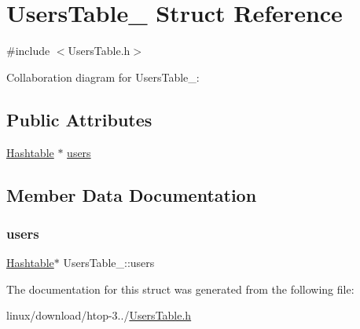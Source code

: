 \hypertarget{structUsersTable__}{}\section{Users\+Table\+\_\+ Struct Reference}
\label{structUsersTable__}


{\ttfamily \#include $<$Users\+Table.\+h$>$}



Collaboration diagram for Users\+Table\+\_\+\+:
\subsection*{Public Attributes}
\begin{DoxyCompactItemize}
\item 
\hyperlink{Hashtable_8h_af67f943dab16c5d7d465c18053edf47f}{Hashtable} $\ast$ \hyperlink{structUsersTable___a7a92aaad71766ee2d0b06c24cb97b756}{users}
\end{DoxyCompactItemize}


\subsection{Member Data Documentation}
\mbox{\label{structUsersTable___a7a92aaad71766ee2d0b06c24cb97b756}} 
\subsubsection{\texorpdfstring{users}{users}}
{\footnotesize\ttfamily \hyperlink{Hashtable_8h_af67f943dab16c5d7d465c18053edf47f}{Hashtable}$\ast$ Users\+Table\+\_\+\+::users}



The documentation for this struct was generated from the following file\+:\begin{DoxyCompactItemize}
\item 
linux/download/htop-\/3../\hyperlink{UsersTable_8h}{Users\+Table.\+h}\end{DoxyCompactItemize}
